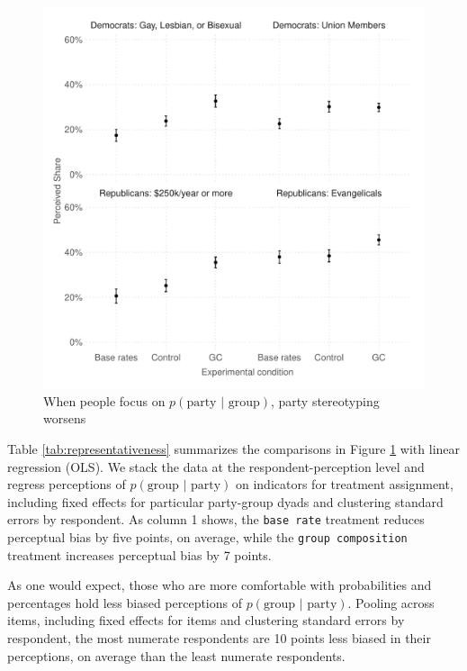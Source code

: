 \documentclass[12pt, letterpaper]{article}
\begin{document}
\begin{figure}
\caption{When people focus on $p(\text{party | group})$, party stereotyping worsens}
\label{fig:rep_ciplots}
\begin{center}
\includegraphics[width=1\textwidth]{../figs/fig_4_bayes.pdf}
\end{center}
\end{figure}

Table \ref{tab:representativeness} summarizes the comparisons in Figure \ref{fig:rep_ciplots} with linear regression (OLS). We stack the data at the respondent-perception level and regress perceptions of $p(\text{group | party})$ on indicators for treatment assignment, including fixed effects for particular party-group dyads and clustering standard errors by respondent. As column 1 shows, the {\tt base rate} treatment reduces perceptual bias by five points, on average, while the {\tt group composition} treatment increases perceptual bias by 7 points. 

As one would expect, those who are more comfortable with probabilities and percentages hold less biased perceptions of $p(\text{group | party})$. Pooling across items, including fixed effects for items and clustering standard errors by respondent, the most numerate respondents are 10 points less biased in their perceptions, on average than the least numerate respondents.
\end{document}
